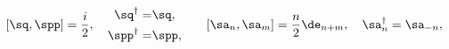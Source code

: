 \begin{equation}\label{ccr}
[\sq,\spp]=\frac{i}{2},\quad
\begin{aligned}\sq^{\dagger}=& \sq,\\
\spp^{\dagger}=&\spp,
\end{aligned}
\qquad [\sa_n,\sa_m]=\frac{n}{2}\de_{n+m},\quad
\sa_n^{\dagger}=\sa_{-n}, 
\end{equation}

